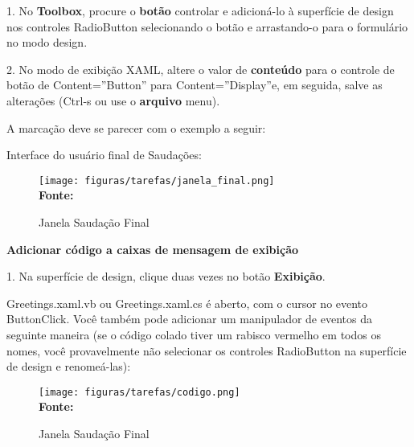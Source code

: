 1. No \textbf{Toolbox}, procure o \textbf{botão} controlar e adicioná-lo à superfície de design nos controles RadioButton selecionando o botão e arrastando-o para o formulário no modo design.

2. No modo de exibição XAML, altere o valor de \textbf{conteúdo} para o controle de botão de Content=”Button” para Content=”Display”e, em seguida, salve as alterações (Ctrl-s ou use o \textbf{arquivo} menu).

A marcação deve se parecer com o exemplo a seguir: 


Interface do usuário final de Saudações:

\begin{figure}[ht!]
	\centering	
	\caption[\hspace{-0.1cm} Janela Saudação Final]{Janela Saudação Final}
	\vspace{-0.4cm}
	\texttt{[image: figuras/tarefas/janela\_final.png]}
	\vspace{-0.2cm}
	\\\textbf{\footnotesize Fonte:~\cite {tutorial_visual:14} }
	\label{fig:janelafinal}
	\vspace{-0.5cm}
\end{figure}



\textbf{Adicionar código a caixas de mensagem de exibição}

1. Na superfície de design, clique duas vezes no botão \textbf{Exibição}.

Greetings.xaml.vb ou Greetings.xaml.cs é aberto, com o cursor no evento ButtonClick. Você também pode adicionar um manipulador de eventos da seguinte maneira (se o código colado tiver um rabisco vermelho em todos os nomes, você provavelmente não selecionar os controles RadioButton na superfície de design e renomeá-las):

\begin{figure}[ht!]
	\centering	
	\caption[\hspace{-0.1cm} Janela Saudação Final]{Janela Saudação Final}
	\vspace{-0.4cm}
	\texttt{[image: figuras/tarefas/codigo.png]}
	\vspace{-0.2cm}
	\\\textbf{\footnotesize Fonte:~\cite {tutorial_visual:14} }
	\label{fig:saudacaofinal}
	\vspace{-0.5cm}
\end{figure}


